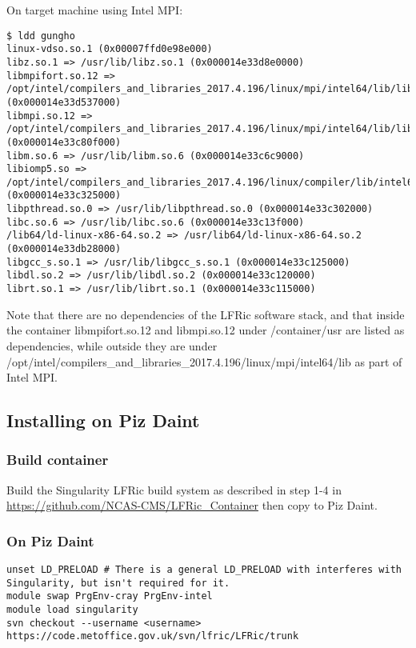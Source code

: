 \documentclass[12pt]{article}
\begin{document}
On target machine using Intel MPI:

\begin{lstlisting}[breaklines]
$ ldd gungho
linux-vdso.so.1 (0x00007ffd0e98e000)
libz.so.1 => /usr/lib/libz.so.1 (0x000014e33d8e0000)
libmpifort.so.12 => /opt/intel/compilers_and_libraries_2017.4.196/linux/mpi/intel64/lib/libmpifort.so.12 (0x000014e33d537000)
libmpi.so.12 => /opt/intel/compilers_and_libraries_2017.4.196/linux/mpi/intel64/lib/libmpi.so.12 (0x000014e33c80f000)
libm.so.6 => /usr/lib/libm.so.6 (0x000014e33c6c9000)
libiomp5.so => /opt/intel/compilers_and_libraries_2017.4.196/linux/compiler/lib/intel64/libiomp5.so (0x000014e33c325000)
libpthread.so.0 => /usr/lib/libpthread.so.0 (0x000014e33c302000)
libc.so.6 => /usr/lib/libc.so.6 (0x000014e33c13f000)
/lib64/ld-linux-x86-64.so.2 => /usr/lib64/ld-linux-x86-64.so.2 (0x000014e33db28000)
libgcc_s.so.1 => /usr/lib/libgcc_s.so.1 (0x000014e33c125000)
libdl.so.2 => /usr/lib/libdl.so.2 (0x000014e33c120000)
librt.so.1 => /usr/lib/librt.so.1 (0x000014e33c115000)
\end{lstlisting}

Note that there are no dependencies of the LFRic software stack, and that inside the container libmpifort.so.12 and libmpi.so.12 under /container/usr are listed as dependencies, while outside they are under /opt/intel/compilers\_and\_libraries\_2017.4.196/linux/mpi/intel64/lib as part of Intel MPI.


\subsection*{Installing on Piz Daint}


\subsubsection*{Build container}

Build the Singularity LFRic build system as described in step 1-4 in\\
\url{https://github.com/NCAS-CMS/LFRic_Container} then copy to Piz Daint.

\subsubsection*{On Piz Daint}

\begin{lstlisting}[breaklines]
unset LD_PRELOAD # There is a general LD_PRELOAD with interferes with Singularity, but isn't required for it.
module swap PrgEnv-cray PrgEnv-intel
module load singularity
svn checkout --username <username> https://code.metoffice.gov.uk/svn/lfric/LFRic/trunk
\end{lstlisting}
\end{document}
